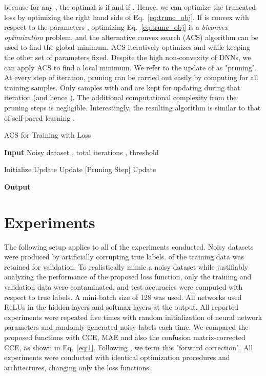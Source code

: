 \documentclass{article}
\renewcommand{\algorithmicrequire}{\textbf{Input }}
\renewcommand{\algorithmicensure}{\textbf{Output }}
\begin{document}
because for any , the optimal  is  if  and  if .
Hence, we can optimize the truncated  loss by optimizing the right hand side of Eq.~\ref{eq:trunc_obj}. If  is convex with respect to the parameters , optimizing Eq.~\ref{eq:trunc_obj} is a \textit{biconvex optimization} problem, and the alternative convex search (ACS) algorithm \cite{bazaraa2013nonlinear} can be used to find the global minimum. ACS iteratively optimizes  and  while keeping the other set of parameters fixed. 
Despite the high non-convexity of DNNs, we can apply ACS to find a local minimum. We refer to the update of  as "pruning". At every step of iteration, pruning can be carried out easily by computing  for all training samples. Only samples with  and  are kept for updating  during that iteration (and hence  ). The additional computational complexity from the pruning steps is negligible. Interestingly, the resulting algorithm is similar to that of self-paced learning \cite{kumar2010self}. 
\begin{algorithm}
\caption{ACS for Training with  Loss}\label{euclid}
\algorithmicrequire{Noisy dataset , total iterations , threshold }
\begin{algorithmic}
\State Initialize  
\State Update 
\While{}
\State Update  [Pruning Step]
\State Update 
\EndWhile
\end{algorithmic}
\algorithmicensure{}
\end{algorithm}

\section{Experiments}\label{sec_4}
The following setup applies to all of the experiments conducted. Noisy datasets were produced by artificially corrupting true labels.  of the training data was retained for validation. To realistically mimic a noisy dataset while justifiably analyzing the performance of the proposed loss function, only the training and validation data were contaminated, and test accuracies were computed with respect to true labels. A mini-batch size of 128 was used. All networks used ReLUs in the hidden layers and softmax layers at the output. All reported experiments were repeated five times with random initialization of neural network parameters and randomly generated noisy labels each time. We compared the proposed functions with CCE, MAE and also the confusion matrix-corrected CCE, as shown in Eq.~\ref{eq:1}. Following \cite{patrini2017making}, we term this "forward correction". All experiments were conducted with identical optimization procedures and architectures, changing only the loss functions.  
\end{document}
